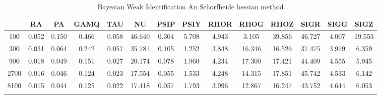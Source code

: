 \documentclass[a4paper,10pt]{article}
\begin{document}
\centering
\begin{longtable}{cccccccccccccc}
\toprule
 & RA & PA & GAMQ & TAU & NU & PSIP & PSIY & RHOR & RHOG & RHOZ & SIGR & SIGG & SIGZ \\
\midrule
100 & 0.052 & 0.150 & 0.466 & 0.058 & 46.640 & 0.304 & 5.708 & 4.943 & 3.105 & 39.856 & 46.727 & 4.007 & 19.553 \\
300 & 0.031 & 0.064 & 0.242 & 0.057 & 35.781 & 0.105 & 1.252 & 3.848 & 16.346 & 16.526 & 37.475 & 3.979 & 6.359 \\
900 & 0.018 & 0.049 & 0.151 & 0.027 & 20.174 & 0.078 & 1.960 & 4.234 & 17.300 & 17.421 & 44.409 & 4.555 & 5.945 \\
2700 & 0.016 & 0.046 & 0.124 & 0.023 & 17.554 & 0.055 & 1.533 & 4.248 & 14.315 & 17.851 & 45.742 & 4.533 & 6.142 \\
8100 & 0.015 & 0.044 & 0.125 & 0.022 & 17.418 & 0.057 & 1.793 & 3.996 & 12.867 & 16.247 & 43.752 & 4.644 & 6.053 \\
\bottomrule
\caption{Bayesian Weak Identification An Schorfheide hessian method}
\label{table:tbl:WeakAnScho_hessian}
\end{longtable}
\end{document}
